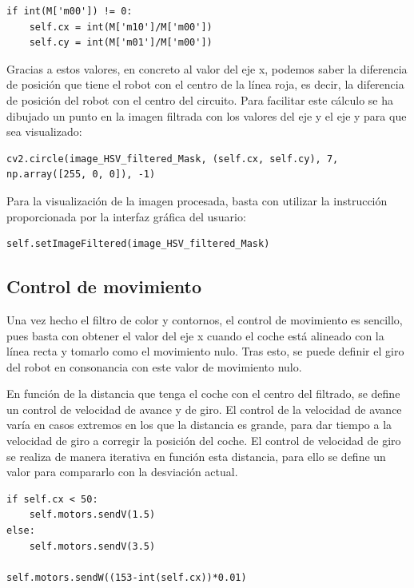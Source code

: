 \lstset{language=Python, breaklines=true, basicstyle=\footnotesize}
\begin{lstlisting}[frame=single]
if int(M['m00']) != 0:
    self.cx = int(M['m10']/M['m00'])
    self.cy = int(M['m01']/M['m00'])
\end{lstlisting}

Gracias a estos valores, en concreto al valor del eje x, podemos saber la diferencia de posición que tiene el robot con el centro de la línea roja, es decir, la diferencia de posición del robot con el centro del circuito. Para facilitar este cálculo se ha dibujado un punto en la imagen filtrada con los valores del eje y el eje y para que sea visualizado:

\lstset{language=Python, breaklines=true, basicstyle=\footnotesize}
\begin{lstlisting}[frame=single]
cv2.circle(image_HSV_filtered_Mask, (self.cx, self.cy), 7, np.array([255, 0, 0]), -1)
\end{lstlisting}

Para la visualización de la imagen procesada, basta con utilizar la instrucción proporcionada por la interfaz gráfica del usuario:

\lstset{language=Python, breaklines=true, basicstyle=\footnotesize}
\begin{lstlisting}[frame=single]
self.setImageFiltered(image_HSV_filtered_Mask)
\end{lstlisting}

\subsection{Control de movimiento}
Una vez hecho el filtro de color y contornos, el control de movimiento es sencillo, pues basta con obtener el valor del eje x cuando el coche está alineado con la línea recta y tomarlo como el movimiento nulo. Tras esto, se puede definir el giro del robot en consonancia con este valor de movimiento nulo.

En función de la distancia que tenga el coche con el centro del filtrado, se define un control de velocidad de avance y de giro. El control de la velocidad de avance varía en casos extremos en los que la distancia es grande, para dar tiempo a la velocidad de giro a corregir la posición del coche. El control de velocidad de giro se realiza de manera iterativa en función esta distancia, para ello se define un valor para compararlo con la desviación actual. 

\lstset{language=Python, breaklines=true, basicstyle=\footnotesize}
\begin{lstlisting}[frame=single]
if self.cx < 50:
    self.motors.sendV(1.5)
else:
    self.motors.sendV(3.5)

self.motors.sendW((153-int(self.cx))*0.01)
\end{lstlisting}

